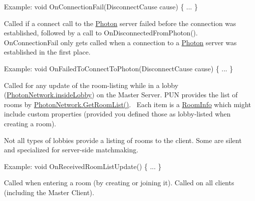 \begin{Desc}
\begin{description}
Example\+: void On\+Connection\+Fail(\+Disconnect\+Cause cause) \{ ... \} \item[{\em 
On\+Failed\+To\+Connect\+To\+Photon\hypertarget{group__public_api_ggaf30bbea51cc8c4b1ddc239d1c5c1468fa7546497495fd3c2f785966943e8d0568}{}\label{group__public_api_ggaf30bbea51cc8c4b1ddc239d1c5c1468fa7546497495fd3c2f785966943e8d0568}
}]Called if a connect call to the \hyperlink{namespace_photon}{Photon} server failed before the connection was established, followed by a call to On\+Disconnected\+From\+Photon(). On\+Connection\+Fail only gets called when a connection to a \hyperlink{namespace_photon}{Photon} server was established in the first place.

Example\+: void On\+Failed\+To\+Connect\+To\+Photon(\+Disconnect\+Cause cause) \{ ... \} \item[{\em 
On\+Received\+Room\+List\+Update\hypertarget{group__public_api_ggaf30bbea51cc8c4b1ddc239d1c5c1468fa75519954740466351e71d794425f6b12}{}\label{group__public_api_ggaf30bbea51cc8c4b1ddc239d1c5c1468fa75519954740466351e71d794425f6b12}
}]Called for any update of the room-\/listing while in a lobby (\hyperlink{class_photon_network_a8ad64b1a76c7918bbe5642639afff458}{Photon\+Network.\+inside\+Lobby}) on the Master Server. P\+UN provides the list of rooms by \hyperlink{class_photon_network_aeef2085375accb7d4bc88e60cbe15eb9}{Photon\+Network.\+Get\+Room\+List()}.~\newline
 Each item is a \hyperlink{class_room_info}{Room\+Info} which might include custom properties (provided you defined those as lobby-\/listed when creating a room).

Not all types of lobbies provide a listing of rooms to the client. Some are silent and specialized for server-\/side matchmaking.

Example\+: void On\+Received\+Room\+List\+Update() \{ ... \} \item[{\em 
On\+Joined\+Room\hypertarget{group__public_api_ggaf30bbea51cc8c4b1ddc239d1c5c1468fa3f4efa6b23780a66a9462d8634cca4c8}{}\label{group__public_api_ggaf30bbea51cc8c4b1ddc239d1c5c1468fa3f4efa6b23780a66a9462d8634cca4c8}
}]Called when entering a room (by creating or joining it). Called on all clients (including the Master Client). 


\end{description}
\end{Desc}
